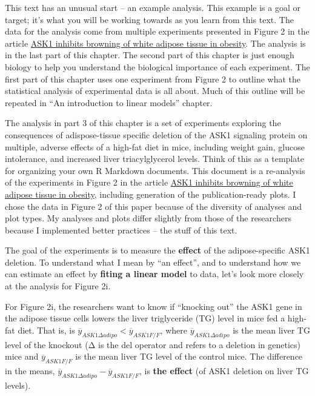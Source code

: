 \documentclass[]{book}
\begin{document}
This text has an unusual start -- an example analysis. This example is a goal or target; it's what you will be working towards as you learn from this text. The data for the analysis come from multiple experiments presented in Figure 2 in the article \href{https://www.nature.com/articles/s41467-020-15483-7}{ASK1 inhibits browning of white adipose tissue in obesity}. The analysis is in the last part of this chapter. The second part of this chapter is just enough biology to help you understand the biological importance of each experiment. The first part of this chapter uses one experiment from Figure 2 to outline what the statistical analysis of experimental data is all about. Much of this outline will be repeated in ``An introduction to linear models'' chapter.

The analysis in part 3 of this chapter is a set of experiments exploring the consequences of adispose-tissue specific deletion of the ASK1 signaling protein on multiple, adverse effects of a high-fat diet in mice, including weight gain, glucose intolerance, and increased liver triacylglycerol levels. Think of this as a template for organizing your own R Markdown documents. This document is a re-analysis of the experiments in Figure 2 in the article \href{https://www.nature.com/articles/s41467-020-15483-7}{ASK1 inhibits browning of white adipose tissue in obesity}, including generation of the publication-ready plots. I chose the data in Figure 2 of this paper because of the diversity of analyses and plot types. My analyses and plots differ slightly from those of the researchers because I implemented better practices -- the stuff of this text.

The goal of the experiments is to measure the \textbf{effect} of the adipose-specific ASK1 deletion. To understand what I mean by ``an effect'', and to understand how we can estimate an effect by \textbf{fiting a linear model} to data, let's look more closely at the analysis for Figure 2i.

For Figure 2i, the researchers want to know if ``knocking out'' the ASK1 gene in the adipose tissue cells lowers the liver triglyceride (TG) level in mice fed a high-fat diet. That is, is \(\overline{y}_{ASK1Δadipo} < \overline{y}_{ASK1F/F}\), where \(\overline{y}_{ASK1Δadipo}\) is the mean liver TG level of the knockout (Δ is the del operator and refers to a deletion in genetics) mice and \(\overline{y}_{ASK1F/F}\) is the mean liver TG level of the control mice. The difference in the means, \(\overline{y}_{ASK1Δadipo} - \overline{y}_{ASK1F/F}\), is \textbf{the effect} (of ASK1 deletion on liver TG levels).
\end{document}
